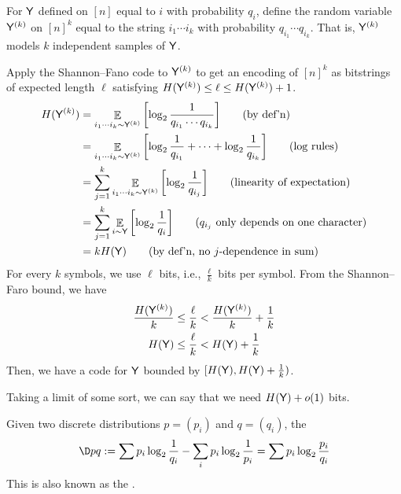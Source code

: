 \documentclass[class=co432,notes,tikz]{agony}
\DeclareMathOperator*{\E}{\mathbb{E}}
\begin{document}
\begin{sol}[batching]
  For $\mathsf Y$ defined on $[n]$ equal to $i$ with probability $q_i$,
  define the random variable $\mathsf Y^{(k)}$ on $[n]^k$
  equal to the string $i_1\cdots i_k$ with probability $q_{i_1}\cdots q_{i_k}$.
  That is, $\mathsf Y^{(k)}$ models $k$ independent samples of $\mathsf Y$.

  Apply the Shannon--Fano code to $\mathsf Y^{(k)}$
  to get an encoding of $[n]^k$ as bitstrings of expected length $\ell$
  satisfying $H(\mathsf Y^{(k)}) \leq \ell \leq H(\mathsf Y^{(k)}) + 1$.
  \begin{align*}
    H(\rv Y^{(k)}) & = \E_{i_1\cdots i_k \sim \rv Y^{(k)}}\qty[\log_2 \frac{1}{q_{i_1}\cdots q_{i_k}}] \tag{by def'n}                       \\
                   & = \E_{i_1\cdots i_k \sim \rv Y^{(k)}}\qty[\log_2 \frac{1}{q_{i_1}} + \dotsb + \log_2\frac{1}{q_{i_k}}] \tag{log rules} \\
                   & = \sum_{j=1}^k \E_{i_1\cdots i_k \sim \rv Y^{(k)}}\qty[\log_2 \frac{1}{q_{i_j}}] \tag{linearity of expectation}        \\
                   & = \sum_{j=1}^k \E_{i \sim \rv Y}\qty[\log_2 \frac{1}{q_{i}}] \tag{$q_{i_j}$ only depends on one character}             \\
                   & = kH(\rv Y) \tag{by def'n, no $j$-dependence in sum}
  \end{align*}
  For every $k$ symbols, we use $\ell$ bits, i.e., $\frac{\ell}{k}$ bits per symbol.
  From the Shannon--Faro bound, we have
  \begin{align*}
    \frac{H(\mathsf Y^{(k)})}{k} & \leq \frac{\ell}{k} < \frac{H(\mathsf Y^{(k)})}{k} + \frac{1}{k} \\
    H(\mathsf Y)                 & \leq \frac{\ell}{k} < H(\mathsf Y) + \frac{1}{k}
  \end{align*}
  Then, we have a code for $\mathsf Y$ bounded by
  $[H(\mathsf Y), H(\mathsf Y) + \frac{1}{k})$.

  Taking a limit of some sort, we can say that we need $H(\mathsf Y) + o(1)$ bits.
\end{sol}

\begin{defn*}
  Given two discrete distributions $p = (p_i)$ and $q = (q_i)$,
  the 
  \[ \D p q :=
    \sum p_i \log_2\frac{1}{q_i} - \sum_i p_i \log_2 \frac{1}{p_i}
    = \sum p_i \log_2 \frac{p_i}{q_i} \]
  This is also known as the .
\end{defn*}
\end{document}
